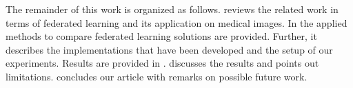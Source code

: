 The remainder of this work is organized as follows.  reviews the related work in terms of federated learning and its application on medical images. In  the applied methods to compare federated learning solutions are provided. Further, it describes the implementations that have been developed and the setup of our experiments. Results are provided in .  discusses the results and points out limitations.  concludes our article with remarks on possible future work.










\begin{comment}
 

The recent years have proved that deep learning%
is able to achieve state-of-the-art performance, even surpassing human-level performance, on a multitude of different tasks ranging from computer vision and speech recognition to natural language processing \citep{He2015DelvingClassification, Hinton2012DeepGroups, Devlin2019BERT:Understanding}. Also, within the medical domain, deep learning has gained attention, and models with expert-level performance have been reported \citep{Esteva2017Dermatologist-levelNetworks}.

The availability of huge amounts of annotated data is one of the key factors for this success, namely datasets such as ImageNet \citep{Deng2009ImageNet:Database}. Deep learning in the medical domain is not different in that regard: To achieve human-level or clinical-grade performance, the amount and quality of annotated data available for model development are crucial. This applies in particular to very rare diseases or diseases with highly heterogeneous disorders \citep{Esteva2017Dermatologist-levelNetworks, DeFauw2018ClinicallyDisease, Dluhos2017Multi-centerApproach}.




\end{comment}
